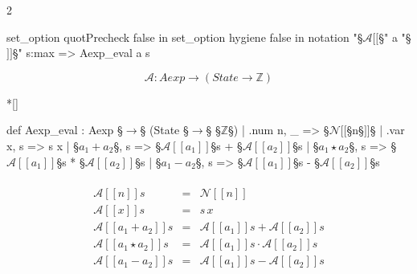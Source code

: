 \begin{paracol}{2}
\begin{leftcolumn}
    \begin{Lean_Code}
set_option quotPrecheck
  false in
set_option hygiene false in
notation "§\color{purple}\(\mathcal{A}[\![\)§" a "§\color{purple}\(]\!]\)§" s:max =>
  Aexp_eval a s
    \end{Lean_Code}
\end{leftcolumn}
\begin{rightcolumn}
    \[
    \mathcal{A} : Aexp \to (State \to \mathbb{Z})
    \]
\end{rightcolumn}

\switchcolumn[1]*[]
\begin{leftcolumn}
    \begin{Lean_Code}
def Aexp_eval : Aexp §\(\to\)§
  (State §\(\to\)§ §\(\mathbb{Z}\)§)
  | .num n, _ => §\(\mathcal{N}[\![\)§n§\(]\!]\)§
  | .var x, s => s x
  | §\(a_1 + a_2\)§, s => §\(\mathcal{A}[\![a_1]\!]\)§s + §\(\mathcal{A}[\![a_2]\!]\)§s
  | §\(a_1 \star a_2\)§, s => §\(\mathcal{A}[\![a_1]\!]\)§s * §\(\mathcal{A}[\![a_2]\!]\)§s
  | §\(a_1 - a_2\)§, s => §\(\mathcal{A}[\![a_1]\!]\)§s - §\(\mathcal{A}[\![a_2]\!]\)§s
    \end{Lean_Code}
\end{leftcolumn}
\begin{rightcolumn}
    \[
    \begin{array}{rcl}
        \\[1.8em]
        \mathcal{A}[\![n]\!]s &=& \mathcal{N}[\![n]\!] \\
        \mathcal{A}[\![x]\!]s &=& s \, x \\
        \mathcal{A}[\![a_1 + a_2]\!]s &=& \mathcal{A}[\![a_1]\!]s + \mathcal{A}[\![a_2]\!]s \\
        \mathcal{A}[\![a_1 \star a_2]\!]s &=& \mathcal{A}[\![a_1]\!]s \cdot \mathcal{A}[\![a_2]\!]s \\
        \mathcal{A}[\![a_1 - a_2]\!]s &=& \mathcal{A}[\![a_1]\!]s - \mathcal{A}[\![a_2]\!]s
    \end{array}
    \]
\end{rightcolumn}
\end{paracol}
\vspace{1em}

